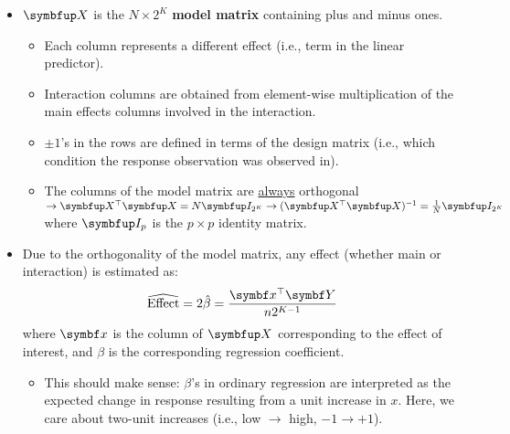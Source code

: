 \begin{itemize}
\begin{itemize}
              \item $ \Matrix{X} $ is the $ N\times 2^K $ \textbf{model matrix} containing plus and minus ones.
                    \begin{itemize}
                        \item Each column represents a different effect (i.e., term in the linear predictor).
                        \item Interaction columns are obtained from element-wise multiplication of the main effects columns involved in the interaction.
                        \item $ \pm 1 $'s in the rows are defined in terms of the design matrix (i.e., which condition the response observation was observed in).
                        \item The columns of the model matrix are \underline{always} orthogonal $ \rightarrow \Matrix{X}^\top \Matrix{X}=N\Matrix{I}_{2^K}
                                  \rightarrow (\Matrix{X}^\top \Matrix{X})^{-1}=\frac{1}{N}\Matrix{I}_{2^K}$ where $ \Matrix{I}_p $ is the $ p\times p $
                              identity matrix.
                    \end{itemize}
              \item Due to the orthogonality of the model matrix, any effect (whether main or interaction) is estimated as:
                    \[ \widehat{\text{Effect}}=2\hat{\beta}=\frac{\Vector{x}^\top \RandomVector{Y}}{n 2^{K-1}}  \]
                    where $ \Vector{x} $ is the column of $ \Matrix{X} $ corresponding to the effect of interest, and $ \beta $ is the corresponding
                    regression coefficient.
                    \begin{itemize}[*]
                        \item This should make sense: $ \beta $'s in ordinary regression are interpreted as the expected change in response
                              resulting from a unit increase in $ x $. Here, we care about two-unit increases (i.e., low $\rightarrow $ high, $-1\rightarrow +1$).
                    \end{itemize}
          \end{itemize}
\end{itemize}
